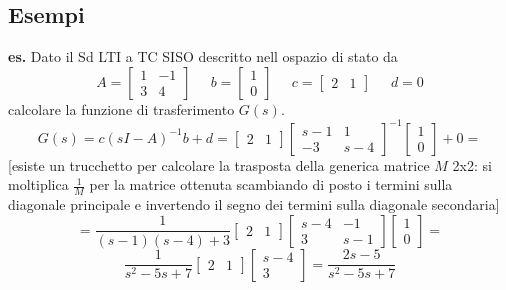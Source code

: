 \subsection{Esempi}
\textbf{es.}  Dato il Sd LTI a TC SISO descritto nell ospazio di stato da 
\[
    A=\left[\begin{matrix}
        1 & -1\\
        3 & 4
    \end{matrix}\right] \;\;\;\;\; b = \left[\begin{matrix}
        1\\0
    \end{matrix}\right] \;\;\;\;\; c= \left[\begin{matrix}
        2 &1
    \end{matrix}\right] \;\;\;\;\;d=0
\]
calcolare la funzione di trasferimento $G(s)$.
\[
    G(s) = c (sI-A)^{-1} b +d = \left[\begin{matrix}
        2 &1
    \end{matrix}\right]\left[\begin{matrix}
        s-1&1\\
        -3 & s-4
    \end{matrix}\right]^{-1} \left[\begin{matrix}
        1\\0
    \end{matrix}\right]+0 = 
\]
[esiste un trucchetto per calcolare la trasposta della generica matrice $M$ 2x2: si moltiplica $\frac{1}{M}$ per la matrice ottenuta scambiando di posto i termini sulla diagonale principale e invertendo il segno dei termini sulla diagonale secondaria]
\[
    = \frac{1}{(s-1)(s-4) +3} \left[\begin{matrix}
        2&1
    \end{matrix}\right]\left[\begin{matrix}
        s-4 & -1\\
        3 & s-1
    \end{matrix}\right]\left[\begin{matrix}
        1\\0
    \end{matrix}\right]=
\]
\[
    \frac{1}{s^2 -5s +7} \left[\begin{matrix}
        2&1
    \end{matrix}\right]\left[\begin{matrix}
        s-4\\3
    \end{matrix}\right] = \frac{2s -5 }{s^2 -5s +7}
\]
